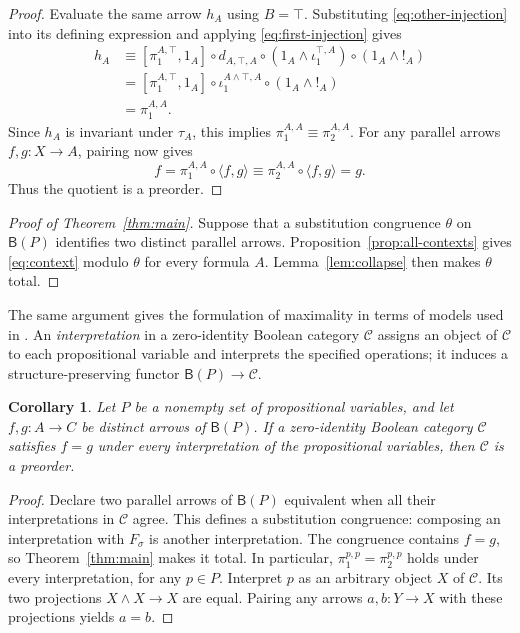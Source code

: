 \documentclass[11pt]{article}
\newtheorem{corollary}[theorem]{Corollary}
\newcommand{\B}{\mathsf B}
\begin{document}
\begin{proof}
Evaluate the same arrow $h_A$ using $B=\top$.
Substituting \eqref{eq:other-injection} into its defining expression
and applying \eqref{eq:first-injection} gives
\[
 \begin{aligned}
 h_A
   &\equiv[\pi_1^{A,\top},1_A]\circ d_{A,\top,A}
       \circ(1_A\wedge\iota_1^{\top,A})
       \circ(1_A\wedge!_A)\\
   &=[\pi_1^{A,\top},1_A]\circ\iota_1^{A\wedge\top,A}
       \circ(1_A\wedge!_A)\\
   &=\pi_1^{A,A}.
 \end{aligned}
\]
Since $h_A$ is invariant under $\tau_A$, this implies
$\pi_1^{A,A}\equiv\pi_2^{A,A}$.
For any parallel arrows $f,g:X\to A$, pairing now gives
\[
 f=\pi_1^{A,A}\circ\langle f,g\rangle
   \equiv\pi_2^{A,A}\circ\langle f,g\rangle=g.
\]
Thus the quotient is a preorder.
\end{proof}

\begin{proof}[Proof of Theorem~\ref{thm:main}]
Suppose that a substitution congruence $\theta$ on $\B(P)$ identifies
two distinct parallel arrows. Proposition~\ref{prop:all-contexts}
gives \eqref{eq:context} modulo $\theta$ for every formula $A$.
Lemma~\ref{lem:collapse} then makes $\theta$ total.
\end{proof}

The same argument gives the formulation of maximality in terms of
models used in \cite[\S9.3, p.~194]{DP}. An \emph{interpretation} in
a zero-identity Boolean category $\mathcal C$ assigns an object of
$\mathcal C$ to each propositional variable and interprets the
specified operations; it induces a structure-preserving functor
$\B(P)\to\mathcal C$.

\begin{corollary}\label{cor:models}
Let $P$ be a nonempty set of propositional variables, and let
$f,g:A\to C$ be distinct arrows of $\B(P)$.
If a zero-identity Boolean category $\mathcal C$ satisfies $f=g$
under every interpretation of the propositional variables, then
$\mathcal C$ is a preorder.
\end{corollary}

\begin{proof}
Declare two parallel arrows of $\B(P)$ equivalent when all their
interpretations in $\mathcal C$ agree. This defines a substitution
congruence: composing an interpretation with $F_\sigma$ is another
interpretation. The congruence contains $f=g$, so
Theorem~\ref{thm:main} makes it total. In particular,
$\pi_1^{p,p}=\pi_2^{p,p}$ holds under every interpretation, for any
$p\in P$. Interpret $p$ as an arbitrary object $X$ of $\mathcal C$.
Its two projections $X\wedge X\to X$ are equal. Pairing any arrows
$a,b:Y\to X$ with these projections yields $a=b$.
\end{proof}
\end{document}
